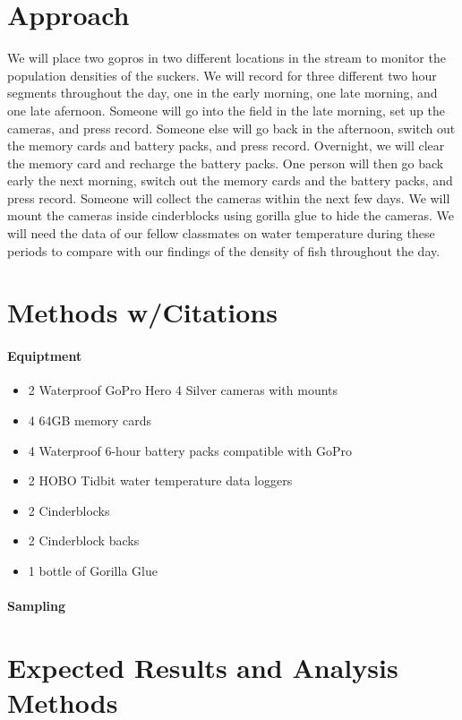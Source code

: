 \documentclass{tufte-handout}
\begin{document}
\section{Approach} We will place two gopros in two different locations in the stream to monitor the population densities of the suckers. We will record for three different two hour segments throughout the day, one in the early morning, one late morning, and one late afernoon.  Someone will go into the field in the late morning, set up the cameras, and press record.  Someone else will go back in the afternoon, switch out the memory cards and battery packs, and press record. Overnight, we will clear the memory card and recharge the battery packs.  One person will then go back early the next morning, switch out the memory cards and the battery packs, and press record.  Someone will collect the cameras within the next few days.  We will mount the cameras inside cinderblocks using gorilla glue to hide the cameras. We will need the data of our fellow classmates on water temperature during these periods to compare with our findings of the density of fish throughout the day.

 

\section{Methods w/Citations} 

\paragraph{Equiptment}  \begin{itemize}
\item 2 Waterproof GoPro Hero 4 Silver cameras with mounts
\item 4 64GB memory cards
\item 4 Waterproof 6-hour battery packs compatible with GoPro
\item 2 HOBO Tidbit water temperature data loggers
\item 2 Cinderblocks
\item 2 Cinderblock backs
\item 1 bottle of Gorilla Glue
\end{itemize}

\paragraph{Sampling}


\section{Expected Results and Analysis Methods}
\end{document}
